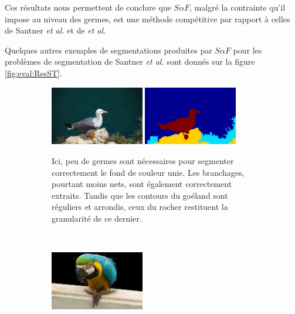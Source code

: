 Ces résultats nous permettent de conclure que $S \alpha F$, malgré la contrainte qu'il impose au niveau des germes, est une méthode compétitive par rapport à celles de Santner \textit{et al.} et de  \textit{et al.}

\begin{emodif}
Quelques autres exemples de segmentations produites par $S \alpha F$ pour les problèmes de segmentation  de Santner \textit{et al.} sont donnés sur la figure \ref{fig:eval:ResST}.
\begin{figure}[htb]
	\centering	
	 \begin{subfigure}[B]{\textwidth}
	 \centering
			\includegraphics[width=0.45\textwidth]{images/evaluation/Santner/image_0015_seeds}
			\includegraphics[width=0.45\textwidth]{images/evaluation/Santner/image_0015_seg}
		 \caption{Ici, peu de germes sont nécessaires pour segmenter correctement le fond de couleur unie. Les branchages, pourtant moins nets, sont également correctement extraits. Tandis que les contours du goéland sont réguliers et arrondis, ceux du rocher restituent la granularité de ce dernier.}
	\end{subfigure}		
	\\	
	 \begin{subfigure}[B]{\textwidth}	
	 \centering
			\includegraphics[width=0.45\textwidth]{images/evaluation/Santner/image_0236_seeds}

\end{subfigure}
\end{figure}
\end{emodif}
